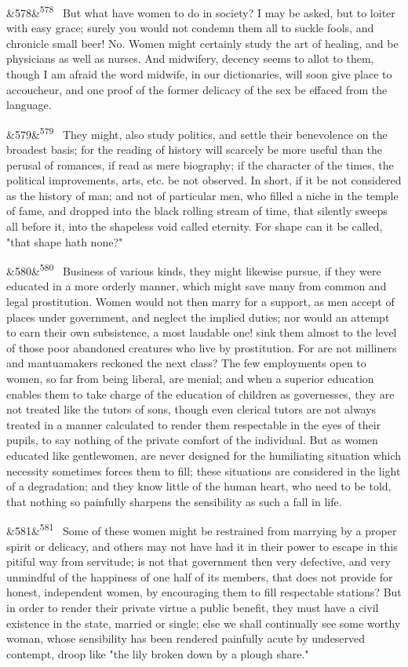 \documentclass[12pt]{article}
\newcommand{\para}[1][]{\par\noindent\ifx&#1&\else\textsuperscript{\footnotesize #1}~\fi}
\begin{document}
\para[578] But what have women to do in society? I may be asked, but to loiter with easy grace; surely you would not condemn them all to suckle fools, and chronicle small beer! No. Women might certainly study the art of healing, and be physicians as well as nurses. And midwifery, decency seems to allot to them, though I am afraid the word midwife, in our dictionaries, will soon give place to accoucheur, and one proof of the former delicacy of the sex be effaced from the language.

\para[579] They might, also study politics, and settle their benevolence on the broadest basis; for the reading of history will scarcely be more useful than the perusal of romances, if read as mere biography; if the character of the times, the political improvements, arts, etc. be not observed. In short, if it be not considered as the history of man; and not of particular men, who filled a niche in the temple of fame, and dropped into the black rolling stream of time, that silently sweeps all before it, into the shapeless void called eternity. For shape can it be called, "that shape hath none?"

\para[580] Business of various kinds, they might likewise pursue, if they were educated in a more orderly manner, which might save many from common and legal prostitution. Women would not then marry for a support, as men accept of places under government, and neglect the implied duties; nor would an attempt to earn their own subsistence, a most laudable one! sink them almost to the level of those poor abandoned creatures who live by prostitution. For are not milliners and mantuamakers reckoned the next class? The few employments open to women, so far from being liberal, are menial; and when a superior education enables them to take charge of the education of children as governesses, they are not treated like the tutors of sons, though even clerical tutors are not always treated in a manner calculated to render them respectable in the eyes of their pupils, to say nothing of the private comfort of the individual. But as women educated like gentlewomen, are never designed for the humiliating situation which necessity sometimes forces them to fill; these situations are considered in the light of a degradation; and they know little of the human heart, who need to be told, that nothing so painfully sharpens the sensibility as such a fall in life.

\para[581] Some of these women might be restrained from marrying by a proper spirit or delicacy, and others may not have had it in their power to escape in this pitiful way from servitude; is not that government then very defective, and very unmindful of the happiness of one half of its members, that does not provide for honest, independent women, by encouraging them to fill respectable stations? But in order to render their private virtue a public benefit, they must have a civil existence in the state, married or single; else we shall continually see some worthy woman, whose sensibility has been rendered painfully acute by undeserved contempt, droop like "the lily broken down by a plough share."
\end{document}
